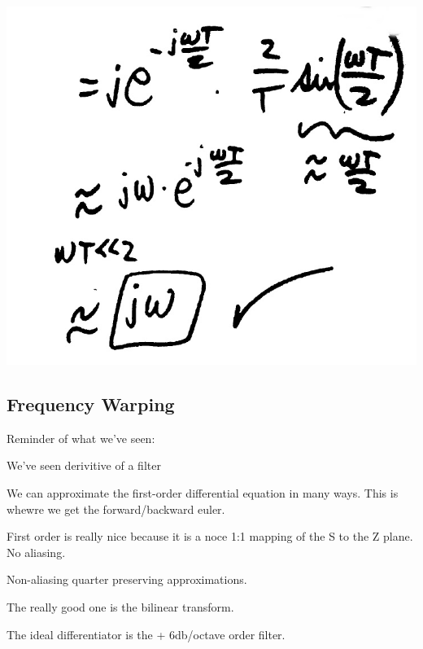 \includegraphics[scale=0.25]{photos/jan17/9e}




\subsection*{Frequency Warping}

Reminder of what we've seen:

We've seen derivitive of a filter 

We can approximate the first-order differential equation in many ways. This
is whewre we get the forward/backward euler. 

First order is really nice because it is a noce 1:1 mapping of the S to the Z plane. No aliasing. 

Non-aliasing quarter preserving approximations. 

The really good one is the bilinear transform. 

The ideal differentiator is the + 6db/octave order filter. 


